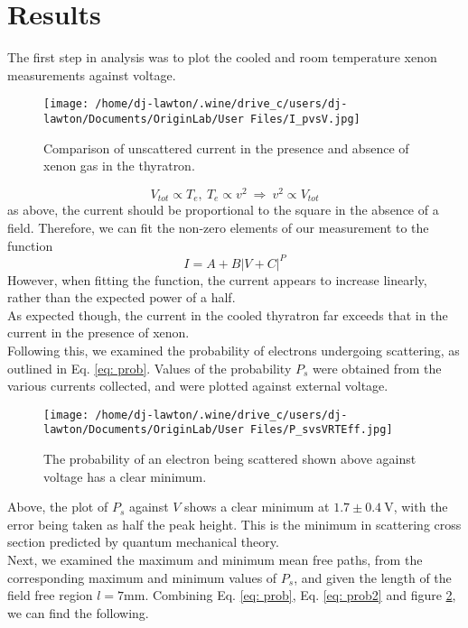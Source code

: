 \documentclass{article}
\begin{document}
\section{Results}
The first step in analysis was to plot the cooled and room temperature xenon measurements against voltage.
\begin{figure}[H]
\begin{center}
\texttt{[image: /home/dj-lawton/.wine/drive\_c/users/dj-lawton/Documents/OriginLab/User Files/I\_pvsV.jpg]}
\caption{\label{fig: I_pcomp} Comparison of unscattered current in the presence and absence of xenon gas in the thyratron.}
\end{center}
\end{figure}
\begin{equation}
V_{tot}\propto T_e,~ T_e\propto v^2 ~\Rightarrow~ v^2 \propto V_{tot}
\end{equation}
as above, the current should be proportional to the square in the absence of a field. Therefore, we can fit the non-zero elements of our measurement to the function
\begin{equation}
I = A + B|V+C|^P
\end{equation}
However, when fitting the function, the current appears to increase linearly, rather than the expected power of a half. \\
\indent As expected though, the current in the cooled thyratron far exceeds that in the current in the presence of xenon.\\
\indent Following this, we examined the probability of electrons undergoing scattering, as outlined in Eq. \ref{eq: prob}. Values of the probability $P_s$ were obtained from the various currents collected, and were plotted against external voltage.\\
\begin{figure}[H]
\begin{center}
\texttt{[image: /home/dj-lawton/.wine/drive\_c/users/dj-lawton/Documents/OriginLab/User Files/P\_svsVRTEff.jpg]}
\caption{\label{fig: probvsV}The probability of an electron being scattered shown above against voltage has a clear minimum.}
\end{center}
\end{figure}
Above, the plot of $P_s$ against $V$ shows a clear minimum at $1.7\pm 0.4 ~\mathrm{V}$, with the error being taken as half the peak height. This is the minimum in scattering cross section predicted by quantum mechanical theory.\\
\indent Next, we examined the maximum and minimum mean free paths, from the corresponding maximum and minimum values of $P_s$, and given the length of the field free region $l=7\mathrm{mm}$. Combining Eq. \ref{eq: prob}, Eq. \ref{eq: prob2} and figure \ref{fig: probvsV}, we can find the following.\\
\end{document}
